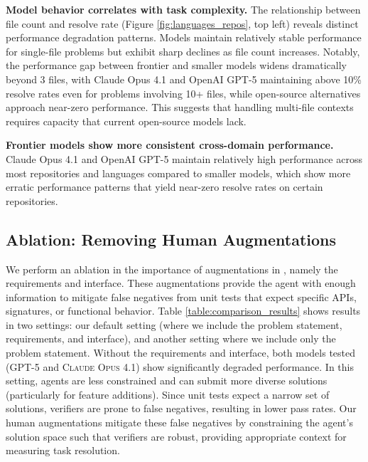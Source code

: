
\textbf{Model behavior correlates with task complexity.} The relationship between file count and resolve rate (Figure \ref{fig:languages_repos}, top left) reveals distinct performance degradation patterns. Models maintain relatively stable performance for single-file problems but exhibit sharp declines as file count increases. Notably, the performance gap between frontier and smaller models widens dramatically beyond 3 files, with Claude Opus 4.1 and OpenAI GPT-5 maintaining above 10\% resolve rates even for problems involving 10+ files, while open-source alternatives approach near-zero performance. This suggests that handling multi-file contexts requires capacity that current open-source models lack.

\textbf{Frontier models show more consistent cross-domain performance.} Claude Opus 4.1 and OpenAI GPT-5 maintain relatively high performance across most repositories and languages compared to smaller models, which show more erratic performance patterns that yield near-zero resolve rates on certain repositories.

\subsection{Ablation: Removing Human Augmentations}

We perform an ablation in the importance of augmentations in \benchmarkname, namely the requirements and interface. These augmentations provide the agent with enough information to mitigate false negatives from unit tests that expect specific APIs, signatures, or functional behavior. Table \ref{table:comparison_results} shows results in two settings: our default setting (where we include the problem statement, requirements, and interface), and another setting where we include only the problem statement. Without the requirements and interface, both models tested (\textsc{GPT-5} and \textsc{Claude Opus 4.1}) show significantly degraded performance. In this setting, agents are less constrained and can submit more diverse solutions (particularly for feature additions). Since unit tests expect a narrow set of solutions, verifiers are prone to false negatives, resulting in lower pass rates. Our human augmentations mitigate these false negatives by constraining the agent's solution space such that verifiers are robust, providing appropriate context for measuring task resolution.


